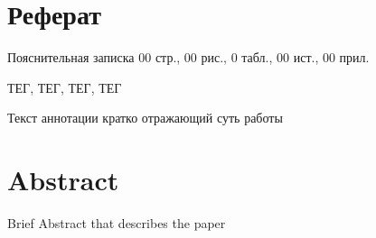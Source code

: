 \newpage
\section*{Реферат}

Пояснительная записка 00 стр., 00 рис., 0 табл.,  00 ист., 00 прил.

\MakeUppercase{тег, тег, тег, тег}

Текст аннотации кратко отражающий суть работы


\newpage
\section*{Abstract}

Brief Abstract that describes the paper


\newpage